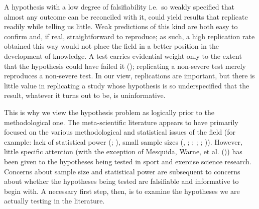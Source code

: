 \documentclass[
]{article}
\begin{document}
A hypothesis with a low degree of falsifiability i.e.~so weakly
specified that almost any outcome can be reconciled with it, could yield
results that replicate readily while telling us little. Weak predictions
of this kind are both easy to confirm and, if real, straightforward to
reproduce; as such, a high replication rate obtained this way would not
place the field in a better position in the development of knowledge. A
test carries evidential weight only to the extent that the hypothesis
could have failed it ();
replicating a non-severe test merely reproduces a non-severe test. In
our view, replications are important, but there is little value in
replicating a study whose hypothesis is so underspecified that the
result, whatever it turns out to be, is uninformative.

This is why we view the hypothesis problem as logically prior to the
methodological one. The meta-scientific literature appears to have
primarily focused on the various methodological and statistical issues
of the field (for example: lack of statistical power
(;
), small sample sizes (, ;
;
;
;
)). However,
little specific attention (with the exception of Mesquida, Warne, et al.
()) has been given to the
hypotheses being tested in sport and exercise science research. Concerns
about sample size and statistical power are subsequent to concerns about
whether the hypotheses being tested are falsifiable and informative to
begin with. A necessary first step, then, is to examine the hypotheses
we are actually testing in the literature.
\end{document}
